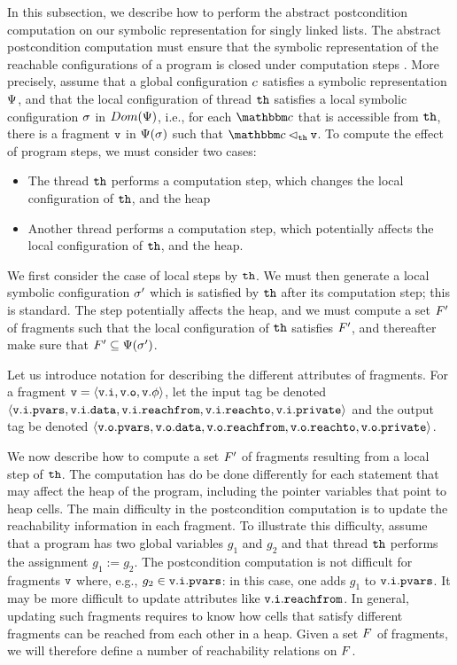 In this subsection, we describe how to perform the abstract postcondition computation on our symbolic representation for singly linked lists. The
abstract postcondition computation must ensure that the symbolic representation
of the reachable configurations of a program is closed under computation
steps .
More precisely, assume that a global configuration $c$ satisfies
a symbolic representation $\Psi$, and that the local configuration
of thread ${\tt th}$ satisfies a local symbolic configuration $\sigma$
in $Dom(\Psi)$, i.e., 
for each $\cell$ that is accessible from ${\tt th}$, there is
  a fragment $\mathtt{v}$ in $\Psi(\sigma)$ such that
  $\cell \lhd_{\thread} \frag$. To compute the effect of program steps, we
  must consider two cases:
\begin{itemize}
\item The thread ${\tt th}$ performs a computation step, which changes the
  local configuration of ${\tt th}$, and the heap
\item Another thread performs a computation step, which potentially affects the
  local configuration of ${\tt th}$, and the heap.
\end{itemize}
We first consider the case of local steps by ${\tt th}$. We must then generate
a local symbolic configuration $\sigma'$
which is satisfied by ${\tt th}$ after its
computation step; this is standard. The step potentially affects the heap,
and we must compute a set $F'$ of fragments such that
the local configuration of ${\tt th}$ satisfies $F'$, and thereafter
make sure that $F' \subseteq \Psi(\sigma')$.

Let us introduce notation for describing the different attributes of
fragments. For a fragment $\mathtt{v} = \left\langle\mathtt{v}.\mathtt{i},\mathtt{v}.\mathtt{o},\mathtt{v}.\phi\right\rangle$,
let the input tag be denoted $\left\langle\mathtt{v}.\mathtt{i}.\mathtt{pvars},\mathtt{v}.\mathtt{i}.\mathtt{data},\mathtt{v}.\mathtt{i}.\mathtt{reachfrom},\mathtt{v}.\mathtt{i}.\mathtt{reachto},\mathtt{v}.\mathtt{i}.\mathtt{private}\right\rangle$ and the output tag
be denoted $\left\langle\mathtt{v}.\mathtt{o}.\mathtt{pvars},\mathtt{v}.\mathtt{o}.\mathtt{data},\mathtt{v}.\mathtt{o}.\mathtt{reachfrom},\mathtt{v}.\mathtt{o}.\mathtt{reachto},\mathtt{v}.\mathtt{o}.\mathtt{private}\right\rangle$.


We now describe how to compute a set $F'$ of fragments resulting
from a local step of ${\tt th}$. The computation has do be done differently for
each statement that may affect the heap of the program, including the
pointer variables that point to heap cells. The main difficulty in the
postcondition computation is to update the reachability information in each
fragment. To illustrate this difficulty, assume that a program has
two global variables $g_1$ and $g_2$ and that thread ${\tt th}$ performs
the assignment $g_1 := g_2$. The postcondition computation is not difficult
for fragments $\mathtt{v}$ where, e.g., $g_2 \in \mathtt{v}.\mathtt{i}.\mathtt{pvars}$: in this
case, one adds $g_1$ to $\mathtt{v}.\mathtt{i}.\mathtt{pvars}$. It may be more difficult
to update attributes like $\mathtt{v}.\mathtt{i}.\mathtt{reachfrom}$.
In general, updating
such fragments requires to know how cells that satisfy different fragments
can be reached from each other in a heap. Given a set $F$ of
fragments, we will therefore define a number of reachability relations on
$F$.

